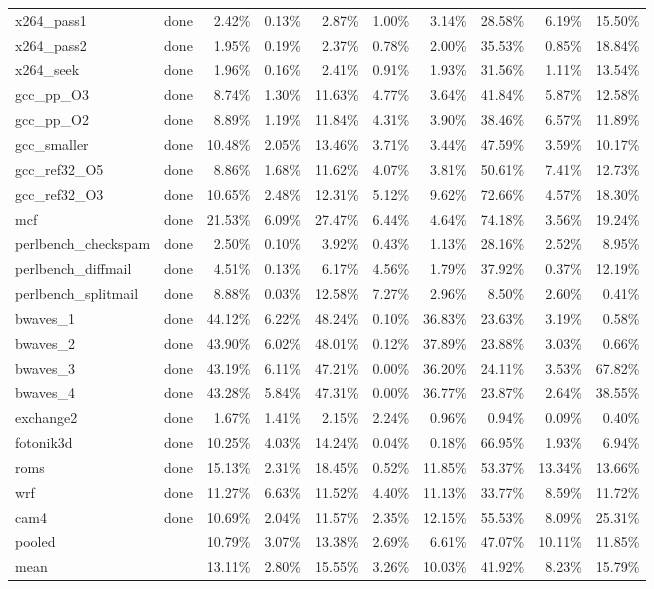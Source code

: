 \documentclass[10pt,a4paper,landscape]{article}
\begin{document}
{\begin{longtable}{llrrrrrrrr}
x264\_pass1 & done & 2.42\% & 0.13\% & 2.87\% & 1.00\% & 3.14\% & 28.58\% & 6.19\% & 15.50\% \\
x264\_pass2 & done & 1.95\% & 0.19\% & 2.37\% & 0.78\% & 2.00\% & 35.53\% & 0.85\% & 18.84\% \\
x264\_seek & done & 1.96\% & 0.16\% & 2.41\% & 0.91\% & 1.93\% & 31.56\% & 1.11\% & 13.54\% \\
gcc\_pp\_O3 & done & 8.74\% & 1.30\% & 11.63\% & 4.77\% & 3.64\% & 41.84\% & 5.87\% & 12.58\% \\
gcc\_pp\_O2 & done & 8.89\% & 1.19\% & 11.84\% & 4.31\% & 3.90\% & 38.46\% & 6.57\% & 11.89\% \\
gcc\_smaller & done & 10.48\% & 2.05\% & 13.46\% & 3.71\% & 3.44\% & 47.59\% & 3.59\% & 10.17\% \\
gcc\_ref32\_O5 & done & 8.86\% & 1.68\% & 11.62\% & 4.07\% & 3.81\% & 50.61\% & 7.41\% & 12.73\% \\
gcc\_ref32\_O3 & done & 10.65\% & 2.48\% & 12.31\% & 5.12\% & 9.62\% & 72.66\% & 4.57\% & 18.30\% \\
mcf & done & 21.53\% & 6.09\% & 27.47\% & 6.44\% & 4.64\% & 74.18\% & 3.56\% & 19.24\% \\
perlbench\_checkspam & done & 2.50\% & 0.10\% & 3.92\% & 0.43\% & 1.13\% & 28.16\% & 2.52\% & 8.95\% \\
perlbench\_diffmail & done & 4.51\% & 0.13\% & 6.17\% & 4.56\% & 1.79\% & 37.92\% & 0.37\% & 12.19\% \\
perlbench\_splitmail & done & 8.88\% & 0.03\% & 12.58\% & 7.27\% & 2.96\% & 8.50\% & 2.60\% & 0.41\% \\
bwaves\_1 & done & 44.12\% & 6.22\% & 48.24\% & 0.10\% & 36.83\% & 23.63\% & 3.19\% & 0.58\% \\
bwaves\_2 & done & 43.90\% & 6.02\% & 48.01\% & 0.12\% & 37.89\% & 23.88\% & 3.03\% & 0.66\% \\
bwaves\_3 & done & 43.19\% & 6.11\% & 47.21\% & 0.00\% & 36.20\% & 24.11\% & 3.53\% & 67.82\% \\
bwaves\_4 & done & 43.28\% & 5.84\% & 47.31\% & 0.00\% & 36.77\% & 23.87\% & 2.64\% & 38.55\% \\
exchange2 & done & 1.67\% & 1.41\% & 2.15\% & 2.24\% & 0.96\% & 0.94\% & 0.09\% & 0.40\% \\
fotonik3d & done & 10.25\% & 4.03\% & 14.24\% & 0.04\% & 0.18\% & 66.95\% & 1.93\% & 6.94\% \\
roms & done & 15.13\% & 2.31\% & 18.45\% & 0.52\% & 11.85\% & 53.37\% & 13.34\% & 13.66\% \\
wrf & done & 11.27\% & 6.63\% & 11.52\% & 4.40\% & 11.13\% & 33.77\% & 8.59\% & 11.72\% \\
cam4 & done & 10.69\% & 2.04\% & 11.57\% & 2.35\% & 12.15\% & 55.53\% & 8.09\% & 25.31\% \\
\midrule
pooled &  & 10.79\% & 3.07\% & 13.38\% & 2.69\% & 6.61\% & 47.07\% & 10.11\% & 11.85\% \\
mean &  & 13.11\% & 2.80\% & 15.55\% & 3.26\% & 10.03\% & 41.92\% & 8.23\% & 15.79\% \\
\end{longtable}
}
\clearpage
\end{document}
